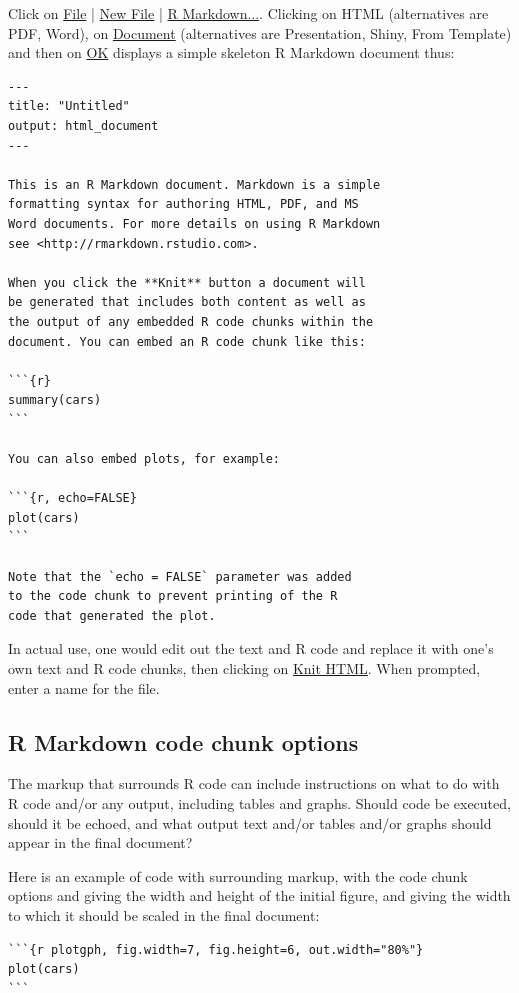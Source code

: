 Click on \underline{File} | \underline{New File} | \underline{R
  Markdown...}.  Clicking on HTML (alternatives are PDF, Word), on
\underline{Document} (alternatives are Presentation, Shiny, From
Template) and then on \underline{OK} displays a simple skeleton R
Markdown document thus:
\begin{verbatim}
---
title: "Untitled"
output: html_document
---

This is an R Markdown document. Markdown is a simple
formatting syntax for authoring HTML, PDF, and MS
Word documents. For more details on using R Markdown
see <http://rmarkdown.rstudio.com>.

When you click the **Knit** button a document will
be generated that includes both content as well as
the output of any embedded R code chunks within the
document. You can embed an R code chunk like this:

```{r}
summary(cars)
```

You can also embed plots, for example:

```{r, echo=FALSE}
plot(cars)
```

Note that the `echo = FALSE` parameter was added
to the code chunk to prevent printing of the R
code that generated the plot.
\end{verbatim}

In actual use, one would edit out the text and R code and replace
it with one's own text and R code chunks, then clicking on
\underline{Knit HTML}. When prompted, enter a name for the file.


\subsection*{R Markdown code chunk options}
The markup that surrounds R code can include instructions on what to
do with R code and/or any output, including tables and graphs. Should
code be executed, should it be echoed, and what output text and/or
tables and/or graphs should appear in the final document?

Here is an example of code with surrounding markup, with the
code chunk options  and 
giving the width and height of the initial figure, and
 giving the width to which it should be scaled
in the final document:
\begin{minipage}[t]{1.05\textwidth}
\begin{verbatim}
```{r plotgph, fig.width=7, fig.height=6, out.width="80%"}
plot(cars)
```
\end{verbatim}
\end{minipage}

